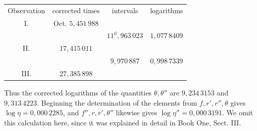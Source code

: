 \begin{center}
\small\setlength{\tabcolsep}{8pt}\renewcommand{\arraystretch}{.85}
\begin{tabular}{@{}cccc@{}}
Observation & corrected times & intervals & logarithms\\[.5em]
I. & Oct. $5{,}451\,988$ & & \\
 & & $11^{\mathrm{d}}{,}963\,023$ & $1{,}077\,8409$\\
II. & $17{,}415\,011$ & & \\
 & & $9{,}970\,887$ & $0{,}998\,7339$\\
III. & $27{,}385\,898$ & & \\
\end{tabular}
\end{center}
\noindent Thus the corrected logarithms of the quantities $\theta,\theta''$ are $9{,}234\,3153$ and $9{,}313\,4223$. Beginning the determination of the elements from $f,r',r'',\theta$ gives $\log\eta=0{,}000\,2285$, and $f'',r,r',\theta''$ likewise gives \mbox{$\log\eta''=0{,}000\,3191$}. We omit this calculation here, since it was explained in detail in Book One, Sect. III.

